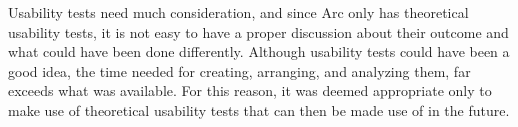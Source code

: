 Usability tests need much consideration, and since Arc only has theoretical usability tests, it is not easy to have a proper discussion about their outcome and what could have been done differently. 
Although usability tests could have been a good idea, the time needed for creating, arranging, and analyzing them, far exceeds what was available. For this reason, it was deemed appropriate only to make use of theoretical usability tests that can then be made use of in the future.



